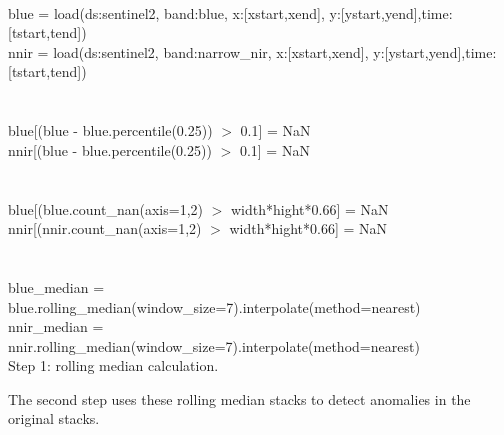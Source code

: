\documentclass[essd, manuscript]{copernicus}
\begin{document}
\begin{algorithm}[H]
\SetAlgoLined
 \\
 blue = load(ds:sentinel2, band:blue, x:[xstart,xend], y:[ystart,yend],time:[tstart,tend])\\
 nnir = load(ds:sentinel2, band:narrow\_nir, x:[xstart,xend], y:[ystart,yend],time:[tstart,tend])\\
 \\
 \\
 blue[(blue - blue.percentile(0.25)) $>$ 0.1] = NaN\\
 nnir[(blue - blue.percentile(0.25)) $>$ 0.1] = NaN\\
 \\
 \\
 blue[(blue.count\_nan(axis=1,2) $>$ width*hight*0.66] = NaN\\
 nnir[(nnir.count\_nan(axis=1,2) $>$ width*hight*0.66] = NaN\\
 \\
 \\
 blue\_median = blue.rolling\_median(window\_size=7).interpolate(method=nearest)\\
 nnir\_median = nnir.rolling\_median(window\_size=7).interpolate(method=nearest)\\
 \caption{Step 1: rolling median calculation.}
\end{algorithm}

The second step uses these rolling median stacks to detect anomalies in the original stacks. 
\end{document}
